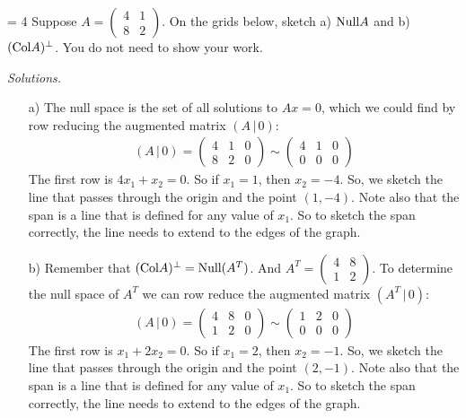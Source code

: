 \ifnum {} \newpage \fi

\ifnum \Version = 4
\question[2] Suppose $A = \begin{pmatrix} 4&1\\8&2 \end{pmatrix}$. On the grids below, sketch a) $\text{Null} A$ and b) $(\text{Col} A)^{\perp}$. You do not need to show your work. 


\ifnum {} {\color{DarkBlue} \textit{Solutions.} \begin{itemize}
    \item[a)] The null space is the set of all solutions to $Ax=0$, which we could find by row reducing the augmented matrix $(A \, | \, 0)$: \begin{align}
    (A \, | \, 0) = \begin{pmatrix} 4&1&0\\8&2&0 \end{pmatrix} \sim \begin{pmatrix} 4&1&0\\0&0&0 \end{pmatrix}
\end{align} The first row is $4x_1 + x_2 = 0$. So if $x_1=1$, then $x_2=-4$. So, we sketch the line that passes through the origin and the point $(1,-4)$. Note also that the span is a line that is defined for any value of $x_1$. So to sketch the span correctly, the line needs to extend to the edges of the graph. 
\item[b)] Remember that $(\text{Col} A)^{\perp} = \text{Null} (A^T)$. And $A^T = \begin{pmatrix} 4&8\\1&2\end{pmatrix}$. To determine the null space of $A^T$ we can row reduce the augmented matrix $(A^T \, | \, 0)$: \begin{align}
    (A \, | \, 0) = \begin{pmatrix} 4&8&0\\1&2&0 \end{pmatrix} \sim \begin{pmatrix} 1&2&0\\0&0&0 \end{pmatrix}
\end{align} The first row is $x_1 + 2x_2 = 0$. So if $x_1=2$, then $x_2=-1$. So, we sketch the line that passes through the origin and the point $(2,-1)$. Note also that the span is a line that is defined for any value of $x_1$. So to sketch the span correctly, the line needs to extend to the edges of the graph. 
\end{itemize}
    \vspace{-12pt}
    \begin{center}
    \qquad
    \end{center}   }
